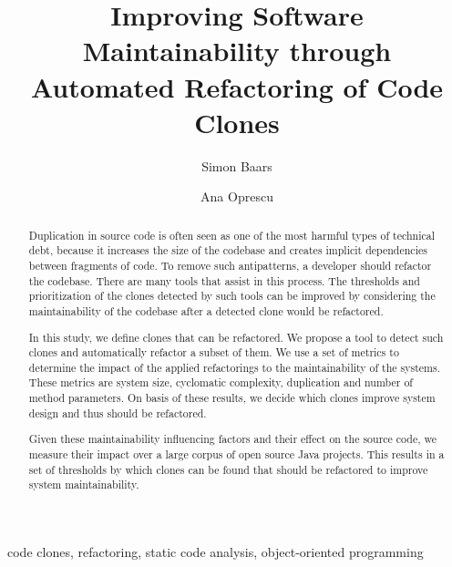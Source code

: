 \documentclass[sigconf,review]{acmart}
\begin{document}
\title{Improving Software Maintainability through Automated Refactoring of Code Clones}

\author{Simon Baars}

\author{Ana Oprescu}

\maketitle

\begin{abstract}
Duplication in source code is often seen as one of the most harmful types of technical debt, because it increases the size of the codebase and creates implicit dependencies between fragments of code. To remove such antipatterns, a developer should refactor the codebase. There are many tools that assist in this process. The thresholds and prioritization of the clones detected by such tools can be improved by considering the maintainability of the codebase after a detected clone would be refactored.

In this study, we define clones that can be refactored. We propose a tool to detect such clones and automatically refactor a subset of them. We use a set of metrics to determine the impact of the applied refactorings to the maintainability of the systems. These metrics are system size, cyclomatic complexity, duplication and number of method parameters. On basis of these results, we decide which clones improve system design and thus should be refactored. %

Given these maintainability influencing factors and their effect on the source code, we measure their impact over a large corpus of open source Java projects. This results in a set of thresholds by which clones can be found that should be refactored to improve system maintainability.
\end{abstract}

\begin{IEEEkeywords}
code clones, refactoring, static code analysis, object-oriented programming
\end{IEEEkeywords}
\end{document}
